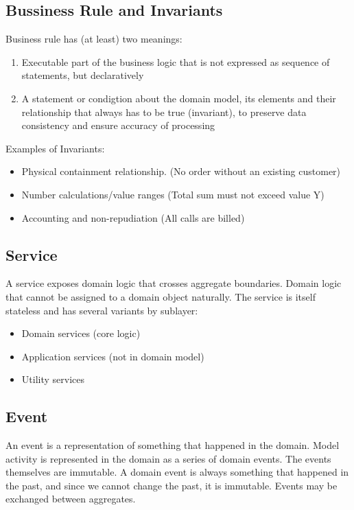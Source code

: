 \documentclass[../Main.tex]{subfiles}
\begin{document}
\subsection{Bussiness Rule and Invariants}
Business rule has (at least) two meanings:
\begin{enumerate}
    \item Executable part of the business logic that is not expressed as sequence of statements, but declaratively
    \item A statement or condigtion about the domain model, its elements and their relationship that always has to be true (invariant),
    to preserve data consistency and ensure accuracy of processing
\end{enumerate}

Examples of Invariants:
\begin{itemize}
    \item Physical containment relationship. (No order without an existing customer)
    \item Number calculations/value ranges (Total sum must not exceed value Y)
    \item Accounting and non-repudiation (All calls are billed)
\end{itemize}

\subsection{Service}
A service exposes domain logic that crosses aggregate boundaries.
Domain logic that cannot be assigned to a domain object naturally.
The service is itself stateless and has several variants by sublayer:
\begin{itemize}
    \item Domain services (core logic)
    \item Application services (not in domain model)
    \item Utility services
\end{itemize}

\subsection{Event}
An event is a representation of something that happened in the domain.
Model activity is represented in the domain as a series of domain events.
The events themselves are immutable. A domain event is always something
that happened in the past, and since we cannot change the past, it is immutable.
Events may be exchanged between aggregates.
\end{document}
